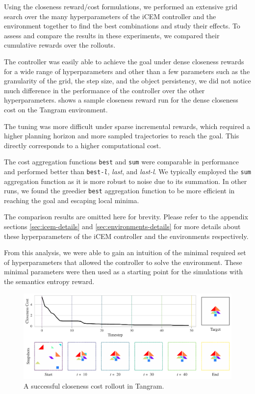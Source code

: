 
Using the closeness reward/cost formulations, we performed an extensive grid search over the many hyperparameters of the iCEM controller and the environment together to find the best combinations and study their effects.
To assess and compare the results in these experiments, we compared their cumulative rewards over the rollouts.

The controller was easily able to achieve the goal under dense closeness rewards for a wide range of hyperparameters and other than a few parameters such as the granularity of the grid, the step size, and the object persistency, we did not notice much difference in the performance of the controller over the other hyperparameters.
 shows a sample closeness reward run for the dense closeness cost on the Tangram environment.

The tuning was more difficult under sparse incremental rewards, which required a higher planning horizon and more sampled trajectories to reach the goal.
This directly corresponds to a higher computational cost.

The cost aggregation functions \texttt{best} and \texttt{sum} were comparable in performance and performed better than \texttt{best-\emph{l}}, \emph{last}, and \emph{last-\emph{l}}.
We typically employed the \texttt{sum} aggregation function as it is more robust to noise due to its summation.
In other runs, we found the greedier \texttt{best} aggregation function to be more efficient in reaching the goal and escaping local minima.

The comparison results are omitted here for brevity. Please refer to the appendix sections \ref{sec:icem-details} and \ref{sec:environments-details} for more details about these hyperparameters of the iCEM controller and the environments respectively.

From this analysis, we were able to gain an intuition of the minimal required set of hyperparameters that allowed the controller to solve the environment.
These minimal parameters were then used as a starting point for the simulations with the semantics entropy reward.

\begin{figure}[H]
    \centering
    \includegraphics[width=\textwidth]{images/closeness_trajectory_495.pdf}
    \caption{A successful closeness cost rollout in Tangram.}
    \label{fig:closeness-rollouts}
\end{figure}


